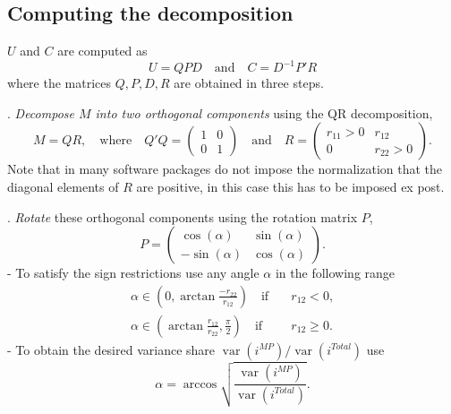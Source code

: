 \documentclass[a4paper,12pt]{article}
\begin{document}
\subsection{Computing the decomposition}
$U$ and $C$ are computed as
\begin{equation}
U = QPD \quad \text{and} \quad C = D^{-1}P'R
\end{equation}
where the matrices $Q,P,D,R$ are obtained in three steps.

\bigskip
{}. \emph{Decompose $M$ into two orthogonal components} using the QR decomposition,
\begin{equation}
M = QR,\quad  \text{where}\quad Q'Q=\begin{pmatrix}1&0\\0&1\end{pmatrix}\quad \text{and}\quad
R=\begin{pmatrix}r_{11}>0&r_{12}\\0&r_{22}>0\end{pmatrix}.
\end{equation}
Note that in many software packages do not impose the normalization that the diagonal elements of $R$ are positive, in this case this has to be imposed ex post.

\bigskip
{}. \emph{Rotate} these orthogonal components using the rotation matrix $P$,
\begin{equation} P = \begin{pmatrix}\cos(\alpha)&\sin(\alpha)\\-\sin(\alpha)&\cos(\alpha)\end{pmatrix}.
\end{equation}
- To satisfy the sign restrictions use any angle $\alpha$ in the following range
\begin{subequations}
\begin{align}
\alpha\in\left(0,\arctan\frac{-r_{22}}{r_{12}}\right)\quad\text{if}\quad&r_{12}<0,\label{eq: angle range rhoneg}\\
\alpha\in\left(\arctan\frac{r_{12}}{r_{22}},\frac{\pi}{2}\right)\quad\text{if}\quad&r_{12}\ge0.\label{eq: angle range rhopos}
\end{align}
\end{subequations}
- To obtain the desired variance share $\operatorname{var}(i^{MP})/\operatorname{var}(i^{Total})$ use
\begin{equation}
\alpha = \arccos \sqrt{\frac{\operatorname{var}(i^{MP})}{\operatorname{var}(i^{Total})}}.
\end{equation}
\end{document}
